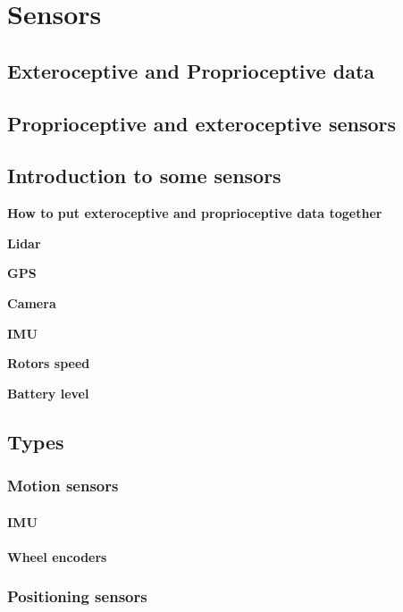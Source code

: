 \chapter{Sensors}





\section{Exteroceptive and Proprioceptive data}

\section{Proprioceptive and exteroceptive sensors}
\section{Introduction to some sensors}
    \textbf{How to put exteroceptive and proprioceptive data together}

    \textbf{Lidar} 

    \textbf{GPS}

    \textbf{Camera} 

    \textbf{IMU}

    \textbf{Rotors speed}

    \textbf{Battery level}
    

\section{Types}
    \subsection{Motion sensors}
        \subsubsection{IMU}
        \subsubsection{Wheel encoders}
    \subsection{Positioning sensors}
